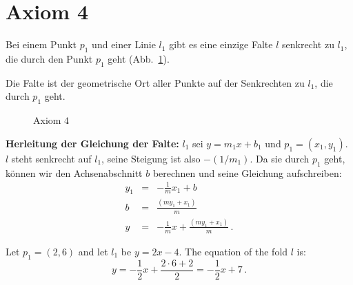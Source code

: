 
\section{Axiom 4}\label{s.ax4}


\begin{axiom}
Bei einem Punkt $p_1$ und einer Linie $l_1$ gibt es eine einzige Falte $l$ senkrecht zu $l_1$, die durch den Punkt $p_1$ geht (Abb.~\ref{f.origami-axiom4}).
\end{axiom}

Die Falte ist der geometrische Ort aller Punkte auf der Senkrechten zu $l_1$, die durch $p_1$ geht.

\begin{figure}[ht]
\begin{center}
\end{center}
\caption{Axiom $4$}\label{f.origami-axiom4}
\end{figure}

\noindent\textbf{Herleitung der Gleichung der Falte:}
$l_1$ sei $y = m_1x + b_1$ und $p_1=(x_1,y_1)$. $l$ steht senkrecht auf $l_1$, seine Steigung ist also $-(1/m_1)$. Da sie durch $p_1$ geht, können wir den Achsenabschnitt $b$ berechnen und seine Gleichung aufschreiben:
\begin{eqnarray*}
y_1&=&-\frac{1}{m} x_1 + b\\
b&=& \frac{(my_1+x_1)}{m}\\
y&=&-\frac{1}{m} x +\frac{(my_1+x_1)}{m}\,.
\end{eqnarray*}
\begin{example}
Let $p_1=(2,6)$ and let $l_1$ be $y=2x-4$. The equation of the fold $l$ is:
\[
y=-\frac{1}{2}x + \frac{2\cdot 6 + 2}{2}=-\frac{1}{2}x + 7\,.
\]
\end{example}

